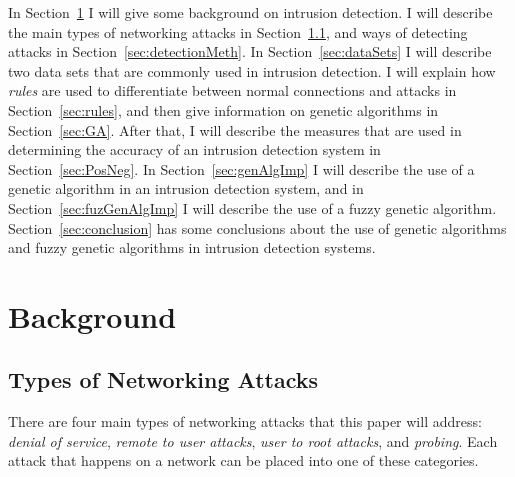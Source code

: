 \documentclass{sig-alternate}
\begin{document}
In Section~\ref{sec:background} I will give some background on intrusion detection. I will describe the main types of networking attacks in Section~\ref{sec:typesAttacks}, and ways of detecting attacks in Section~\ref{sec:detectionMeth}. In Section~\ref{sec:dataSets} I will describe two data sets that are commonly used in intrusion detection. I will explain how \emph{rules} are used to differentiate between normal connections and attacks in Section~\ref{sec:rules}, and then give information on genetic algorithms in Section~\ref{sec:GA}. After that, I will describe the measures that are used in determining the accuracy of an intrusion detection system in Section~\ref{sec:PosNeg}. In Section~\ref{sec:genAlgImp} I will describe the use of a genetic algorithm in an intrusion detection system, and in Section~\ref{sec:fuzGenAlgImp} I will describe the use of a fuzzy genetic algorithm. Section~\ref{sec:conclusion} has some conclusions about the use of genetic algorithms and fuzzy genetic algorithms in intrusion detection systems.




\section{Background}
\label{sec:background}

\subsection{Types of Networking Attacks}
\label{sec:typesAttacks}
There are four main types of networking attacks that this paper will address: \emph{denial of service}, \emph{remote to user attacks}, \emph{user to root attacks}, and \emph{probing}. Each attack that happens on a network can be placed into one of these categories.~\cite{DBLP:journals/corr/abs-1204-1336}
\end{document}
